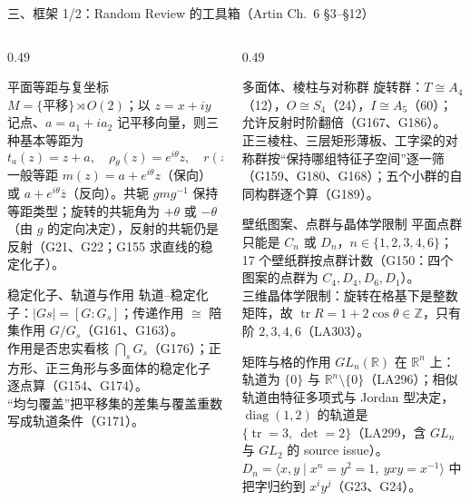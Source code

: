 \documentclass[aspectratio=169,10pt,fontset=none]{ctexbeamer}
\begin{document}
\begin{frame}[t]{三、框架 1/2：Random Review 的工具箱（Artin Ch.~6 \S3--\S12）}
  \label{sec:framework1}
  \begin{columns}[T,onlytextwidth]
    \begin{column}{0.49\textwidth}
      \begin{block}{\footnotesize 平面等距与复坐标}
        \scriptsize
        $M=\{\text{平移}\}\rtimes O(2)$；以 $z=x+iy$ 记点、$a=a_1+ia_2$ 记平移向量，则三种基本等距为
        \[ t_a(z)=z+a,\quad \rho_\theta(z)=e^{i\theta}z,\quad r(z)=\overline z, \]
        一般等距 $m(z)=a+e^{i\theta}z$（保向）或 $a+e^{i\theta}\overline z$（反向）。共轭 $gmg^{-1}$ 保持等距类型；旋转的共轭角为 $+\theta$ 或 $-\theta$（由 $g$ 的定向决定），反射的共轭仍是反射（G21、G22；G155 求直线的稳定化子）。
      \end{block}
      \begin{block}{\footnotesize 稳定化子、轨道与作用}
        \scriptsize
        轨道–稳定化子：$|Gs|=[G:G_s]$；传递作用 $\cong$ 陪集作用 $G/G_s$（G161、G163）。\\
        作用是否忠实看核 $\bigcap_s G_s$（G176）；正方形、正三角形与多面体的稳定化子逐点算（G154、G174）。\\
        “均匀覆盖”把平移集的差集与覆盖重数写成轨道条件（G171）。
      \end{block}
    \end{column}
    \begin{column}{0.49\textwidth}
      \begin{block}{\footnotesize 多面体、棱柱与对称群}
        \scriptsize
        旋转群：$T\cong A_4$（12），$O\cong S_4$（24），$I\cong A_5$（60）；允许反射时阶翻倍（G167、G186）。\\
        正三棱柱、三层矩形薄板、工字梁的对称群按“保持哪组特征子空间”逐一筛（G159、G180、G168）；五个小群的自同构群逐个算（G189）。
      \end{block}
      \begin{block}{\footnotesize 壁纸图案、点群与晶体学限制}
        \scriptsize
        平面点群只能是 $C_n$ 或 $D_n$，$n\in\{1,2,3,4,6\}$；17 个壁纸群按点群计数（G150：四个图案的点群为 $C_4,D_4,D_6,D_1$）。\\
        三维晶体学限制：旋转在格基下是整数矩阵，故 $\operatorname{tr}R=1+2\cos\theta\in\mathbb Z$，只有阶 $2,3,4,6$（LA303）。
      \end{block}
      \begin{block}{\footnotesize 矩阵与格的作用}
        \scriptsize
        $GL_n(\mathbb R)$ 在 $\mathbb R^n$ 上：轨道为 $\{0\}$ 与 $\mathbb R^n\setminus\{0\}$（LA296）；相似轨道由特征多项式与 Jordan 型决定，$\operatorname{diag}(1,2)$ 的轨道是 $\{\operatorname{tr}=3,\ \det=2\}$（LA299，含 $GL_n$ 与 $GL_2$ 的 source issue）。\\
        $D_n=\langle x,y\mid x^n=y^2=1,\ yxy=x^{-1}\rangle$ 中把字归约到 $x^iy^j$（G23、G24）。
      \end{block}
    \end{column}
  \end{columns}
\end{frame}
\end{document}
